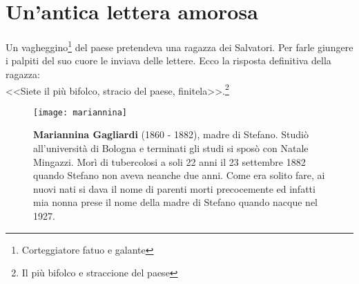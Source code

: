 
\chapter{Un'antica lettera amorosa}
Un vagheggino\footnote{Corteggiatore fatuo e galante} del paese pretendeva una ragazza dei Salvatori. Per farle giungere i palpiti del suo cuore le inviava delle lettere. Ecco la risposta definitiva della ragazza:\\ 
\indent <<Siete il più bifolco, stracio del paese, finitela>>.\footnote{Il più bifolco e straccione del paese} 

 \begin{figure}[htb]
    \centering
    \texttt{[image: mariannina]}
    \caption[Mariannina Gagliardi]{\textbf{Mariannina Gagliardi} (1860 - 1882), madre di Stefano. Studiò all'università di Bologna e terminati gli studi si sposò con Natale Mingazzi. Morì di tubercolosi a soli 22 anni il 23 settembre 1882 quando Stefano non aveva neanche due anni. Come era solito fare, ai nuovi nati si dava il nome di parenti morti precocemente ed infatti mia nonna prese il nome della madre di Stefano quando nacque nel 1927.  \label{fig:mariannina}}
\end{figure}